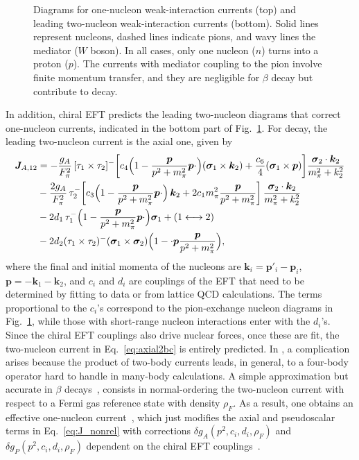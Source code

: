 \begin{figure}[t]
\begin{center}
		\caption{Diagrams for one-nucleon weak-interaction currents (top) and leading two-nucleon weak-interaction currents (bottom). Solid lines represent nucleons, dashed lines indicate pions, and wavy lines the mediator ($W$ boson). In all cases, only one nucleon ($n$) turns into a proton ($p$). The currents with mediator coupling to the pion involve finite momentum transfer, and they are negligible for $\beta$ decay but contribute to \bbonu decay. %
  \label{fig:currents}}
	\end{center}
\end{figure}

In addition, chiral EFT predicts the leading two-nucleon diagrams that correct one-nucleon currents, indicated in the bottom part of Fig.~\ref{fig:currents}. For \bbonu decay, the leading two-nucleon current is the axial one, given by~\cite{Park:2002yp,Krebs:2016rqz,Baroni:2015uza}
\begin{align}
\label{eq:axial2bc}
\bm J_{A,12} &= -\frac{g_A}{F^2_\pi} \, [\tau_1\times\tau_2]^-
\biggl[ 
c_4\Bigl(1-\frac{\bm p}{p^2+m_\pi^2}{\bm p\cdot}\Bigr)
(\bm \sigma_1\times\bm k_2)+\frac{c_6}{4}
(\bm \sigma_1\times \bm p) 
 \biggr]
\frac{\bm \sigma_2\cdot\bm k_2}{m_\pi^2+k_2^2}  \nonumber \\
&-\frac{2g_A}{F^2_\pi} \,\tau_2^-
\biggl[c_3 \Bigl(1-\frac{\bm p}{p^2+m_\pi^2}{\bm p\cdot}\Bigr) \,\bm k_2+2c_1 m_\pi^2 \frac{\bm p}{p^2+m_\pi^2} \biggr]  \, \frac{
	\bm \sigma_2\cdot\bm k_2}{m_\pi^2+k_2^2}  \nonumber \\
&- 2d_1 \,\tau_1^-  \Bigl(1-\frac{\bm p}{p^2+m_\pi^2}{\bm p\cdot}\Bigr)
\bm \sigma_1 +(1\longleftrightarrow2) \nonumber \\
&- 2d_2 (\tau_1\times\tau_2)^- (\bm \sigma_1 \times \bm \sigma_2)
\Bigl(1-{\cdot \bm p}\frac{\bm p}{p^2+m_\pi^2}\Bigr),
\end{align}
where the final and initial momenta of the nucleons are $\bm k_i=\bm p'_i-\bm p_i$, $\bm p = -\bm k_1-\bm k_2$, and $c_i$ and $d_i$ are couplings of the EFT that need to be determined by fitting to data or from lattice QCD calculations. The terms proportional to the $c_i$'s correspond to the pion-exchange nucleon diagrams in Fig.~\ref{fig:currents}, while those with short-range nucleon interactions enter with the $d_i$'s. Since the chiral EFT couplings also drive nuclear forces, once these are fit, the two-nucleon current in Eq.~\eqref{eq:axial2bc} is entirely predicted. In \bbonu, a complication arises because the product of two-body currents leads, in general, to a four-body operator hard to handle in many-body calculations. A simple approximation but accurate in $\beta$ decays~\cite{Gysbers:2019uyb}, consists in normal-ordering the two-nucleon current with respect to a Fermi gas reference state with density $\rho_F$. As a result, one obtains an effective one-nucleon current~\cite{Menendez:2011qq}, which just modifies the axial and pseudoscalar terms in Eq.~\eqref{eq:J_nonrel} with corrections $\delta g_A(p^2,c_i,d_i,\rho_F)$ and $\delta g_P(p^2,c_i,d_i,\rho_F)$ dependent on the chiral EFT couplings~\cite{Hoferichter:2020osn}.

